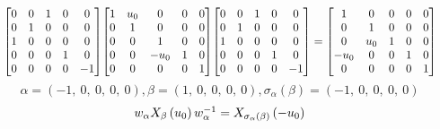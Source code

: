 \documentclass[11pt]{article}
\theoremstyle{definition}
\begin{document}
\[
\scaletoalign{\textwidth}{{\left[\begin{matrix}0 & 0 & 1 & 0 & 0\\0 & 1 & 0 & 0 & 0\\1 & 0 & 0 & 0 & 0\\0 & 0 & 0 & 1 & 0\\0 & 0 & 0 & 0 & -1\end{matrix}\right]} {\left[\begin{matrix}1 & u_{0} & 0 & 0 & 0\\0 & 1 & 0 & 0 & 0\\0 & 0 & 1 & 0 & 0\\0 & 0 & - u_{0} & 1 & 0\\0 & 0 & 0 & 0 & 1\end{matrix}\right]} {\left[\begin{matrix}0 & 0 & 1 & 0 & 0\\0 & 1 & 0 & 0 & 0\\1 & 0 & 0 & 0 & 0\\0 & 0 & 0 & 1 & 0\\0 & 0 & 0 & 0 & -1\end{matrix}\right]} = {\left[\begin{matrix}1 & 0 & 0 & 0 & 0\\0 & 1 & 0 & 0 & 0\\0 & u_{0} & 1 & 0 & 0\\- u_{0} & 0 & 0 & 1 & 0\\0 & 0 & 0 & 0 & 1\end{matrix}\right]}}
\]
\[
\alpha = \left( -1, \  0, \  0, \  0, \  0\right), \beta = \left( 1, \  0, \  0, \  0, \  0\right), \sigma_{\alpha}(\beta) = \left( -1, \  0, \  0, \  0, \  0\right)
\]
\[
\scaletoalign{\textwidth}{w_{\alpha} X_{\beta}\left(u_{0}\right) w_{\alpha}^{-1} = X_{\sigma_{\alpha}\left(\beta\right)}\left(- u_{0}\right)}
\]
\end{document}
